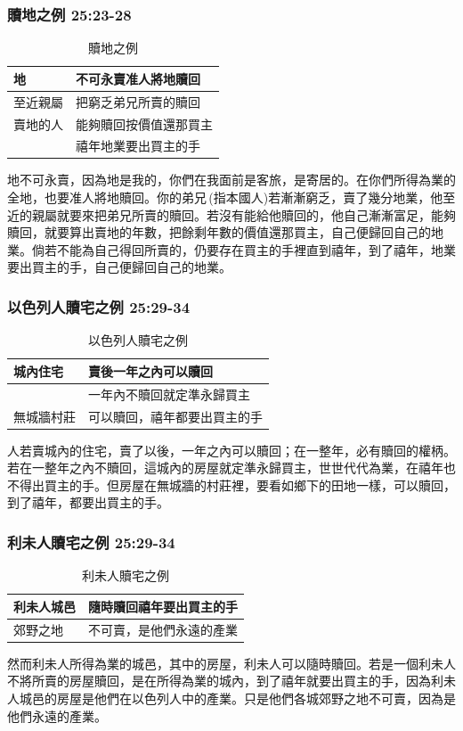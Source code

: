 \subsubsection{贖地之例 25:23-28}
\begin{table}
\vspace*{-3mm}
\centering
\begin{tabular}{l|l}
\toprule
地 &不可永賣准人將地贖回 \\\hline
至近親屬&把窮乏弟兄所賣的贖回\tabularnewline\hline
賣地的人&能夠贖回按價值還那買主\\
             &禧年地業要出買主的手\tabularnewline\hline
\bottomrule
\end{tabular}
\caption{贖地之例}
\end{table} 
地不可永賣，因為地是我的，你們在我面前是客旅，是寄居的。在你們所得為業的全地，也要准人將地贖回。你的弟兄 (指本國人)若漸漸窮乏，賣了幾分地業，他至近的親屬就要來把弟兄所賣的贖回。若沒有能給他贖回的，他自己漸漸富足，能夠贖回，就要算出賣地的年數，把餘剩年數的價值還那買主，自己便歸回自己的地業。倘若不能為自己得回所賣的，仍要存在買主的手裡直到禧年，到了禧年，地業要出買主的手，自己便歸回自己的地業。

\subsubsection{以色列人贖宅之例 25:29-34}
\begin{table}
\vspace*{-5mm}
\centering
\begin{tabular}{l|l}
\toprule
城內住宅   &賣後一年之內可以贖回 \\\hline
                &一年內不贖回就定準永歸買主 \\\hline
無城牆村莊&可以贖回，禧年都要出買主的手\tabularnewline\hline
\bottomrule
\end{tabular}
\caption{以色列人贖宅之例}
\end{table} 
人若賣城內的住宅，賣了以後，一年之內可以贖回；在一整年，必有贖回的權柄。若在一整年之內不贖回，這城內的房屋就定準永歸買主，世世代代為業，在禧年也不得出買主的手。但房屋在無城牆的村莊裡，要看如鄉下的田地一樣，可以贖回，到了禧年，都要出買主的手。 \\

\vspace*{-10mm}
\subsubsection{利未人贖宅之例 25:29-34}
\begin{table}
\vspace*{-4mm}
\centering
\begin{tabular}{l|l}
\toprule
利未人城邑&隨時贖回禧年要出買主的手\tabularnewline\hline
郊野之地   &不可賣，是他們永遠的產業\tabularnewline\hline
\bottomrule
\end{tabular}
\caption{利未人贖宅之例}
\end{table} 
然而利未人所得為業的城邑，其中的房屋，利未人可以隨時贖回。若是一個利未人不將所賣的房屋贖回，是在所得為業的城內，到了禧年就要出買主的手，因為利未人城邑的房屋是他們在以色列人中的產業。只是他們各城郊野之地不可賣，因為是他們永遠的產業。

